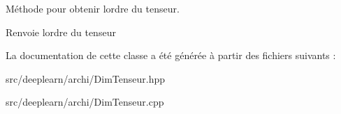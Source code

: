 Méthode pour obtenir l\textquotesingle{}ordre du tenseur. 

\begin{DoxyReturn}{Renvoie}
l\textquotesingle{}ordre du tenseur 
\end{DoxyReturn}


La documentation de cette classe a été générée à partir des fichiers suivants \+:\begin{DoxyCompactItemize}
\item 
src/deeplearn/archi/Dim\+Tenseur.\+hpp\item 
src/deeplearn/archi/Dim\+Tenseur.\+cpp\end{DoxyCompactItemize}
